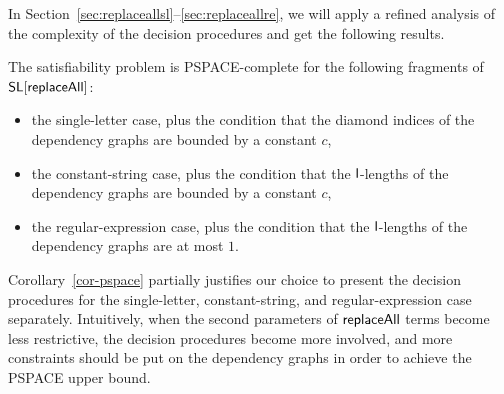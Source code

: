 In Section~\ref{sec:replaceallsl}--\ref{sec:replaceallre}, we will apply a refined analysis of the complexity of the decision procedures and get the following results.

\begin{corollary}\label{cor-pspace}
The satisfiability problem is PSPACE-complete for the following fragments of $\mathsf{SL}[\mathsf{replaceAll}]$:
\begin{itemize}
\item the single-letter case, plus the condition that the diamond indices of the dependency graphs are bounded by a constant $c$, 
%
\item the constant-string case, plus the condition that the $\mathsf{l}$-lengths of the dependency graphs are bounded by a constant $c$, 

%
\item the regular-expression case, plus the condition that the $\mathsf{l}$-lengths of the dependency graphs are at most $1$.
\end{itemize}
\end{corollary}

Corollary~\ref{cor-pspace} partially justifies our choice to present the decision procedures for the single-letter, constant-string, and regular-expression case separately. Intuitively, when the second parameters of $\mathsf{replaceAll}$ terms become less restrictive, the decision procedures become more involved, and more constraints should be put on the dependency graphs in order to achieve the PSPACE upper bound.




 

